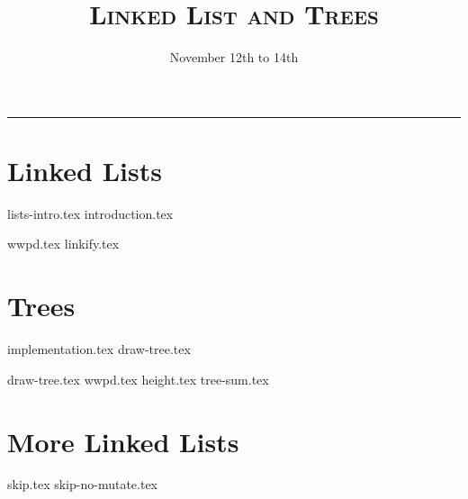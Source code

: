 \documentclass{exam}
\title{\textsc{Linked List and Trees}}
\date{November 12th to 14th}
\begin{document}
\maketitle
\rule{\textwidth}{0.15em}
\fontsize{12}{15}\selectfont


\section{Linked Lists}
{lists-intro.tex}
{introduction.tex}
\begin{questions}
{wwpd.tex}
\newpage
{linkify.tex}
\end{questions}
\newpage
\section{Trees}
{implementation.tex}
{draw-tree.tex}
\newpage
\begin{questions}
{draw-tree.tex}
{wwpd.tex}
{height.tex} 
{tree-sum.tex}
\end{questions}
\newpage
\section{More Linked Lists}

\begin{questions}
{skip.tex}
{skip-no-mutate.tex}
\end{questions}
\end{document}
